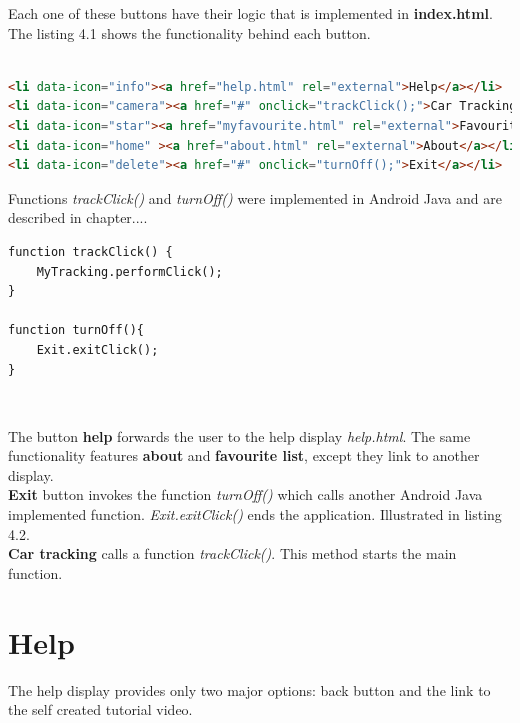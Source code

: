 Each one of these buttons have their logic that is implemented in \textbf{index.html}. The listing 4.1 shows the functionality behind each button.
\\
\
\
\begin{lstlisting}[language=html, caption= 
start menu source code,captionpos=b]
<li data-icon="info"><a href="help.html" rel="external">Help</a></li>
<li data-icon="camera"><a href="#" onclick="trackClick();">Car Tracking</a></li>
<li data-icon="star"><a href="myfavourite.html" rel="external">Favourite List</a></li>
<li data-icon="home" ><a href="about.html" rel="external">About</a></li>
<li data-icon="delete"><a href="#" onclick="turnOff();">Exit</a></li>
\end{lstlisting}





Functions \textit{trackClick()} and \textit{turnOff()} were implemented in Android Java and are described in chapter....
\\


\begin{lstlisting}[language=html, caption= 
JavaScript functions,captionpos=b]
function trackClick() {
    MyTracking.performClick();
}

function turnOff(){
	Exit.exitClick();
}
\end{lstlisting}
\


The button \textbf{help} forwards the user to the help display \textit{help.html}. The same functionality features \textbf{about} and \textbf{favourite list}, except they link to another display. 
\\

\textbf{Exit} button invokes the function \textit{turnOff()} which calls another Android Java implemented function. \textit{Exit.exitClick()} ends the application. Illustrated in listing 4.2.
\\

\textbf{Car tracking} calls a function \textit{trackClick()}. This method starts the main function.
\\

\section{Help}

The help display provides only two major options: back button and the link to the self created tutorial video. 
\\

